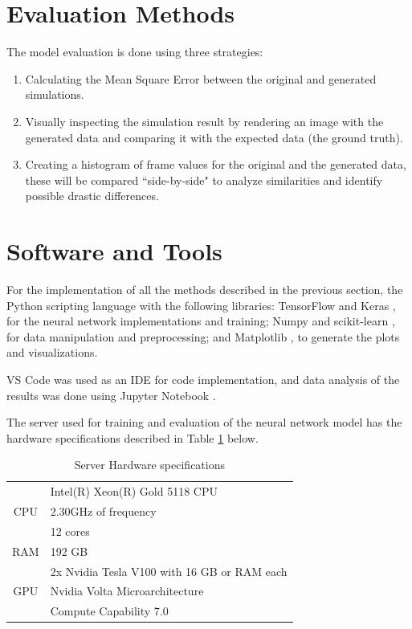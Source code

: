 \section{Evaluation Methods}
\label{sec:EvaluationMethods}
The model evaluation is done using three strategies:
\begin{enumerate}
    \item Calculating the Mean Square Error between the original and generated simulations.
    \item Visually inspecting the simulation result by rendering an image with the generated data and comparing it with the expected data (the ground truth).
    \item Creating a histogram of frame values for the original and the generated data, these will be compared ``side-by-side" to analyze similarities and identify possible drastic differences.
\end{enumerate}

\section{Software and Tools}
\label{sec:SoftwareandTools}
For the implementation of all the methods described in the previous section, the Python \cite{python} scripting language with the following libraries: TensorFlow \cite{tensorflow} and Keras \cite{keras}, for the neural network implementations and training; Numpy \cite{numpy} and scikit-learn \cite{scikit-learn}, for data manipulation and preprocessing; and Matplotlib \cite{matplotlib}, to generate the plots and visualizations.

VS Code was used as an IDE for code implementation, and data analysis of the results was done using Jupyter Notebook \cite{jupyter}.

The server used for training and evaluation of the neural network model has the hardware specifications described in Table \ref{tab:serverHW} below.

\begin{table}[h]
    \caption{Server Hardware specifications}
    \centering
    \begin{tabular}{|c|l|}
    \hline
    \multirow{3}{*}{CPU} & Intel(R) Xeon(R) Gold 5118 CPU       \\
                         & 2.30GHz of frequency                 \\
                         & 12 cores                             \\ \hline
    RAM                  & 192 GB                               \\ \hline
    \multirow{3}{*}{GPU} & 2x Nvidia Tesla V100 with 16 GB or RAM each \\
                         & Nvidia Volta Microarchitecture       \\
                         & Compute Capability 7.0               \\ \hline
    \end{tabular}
    \label{tab:serverHW}
\end{table}

